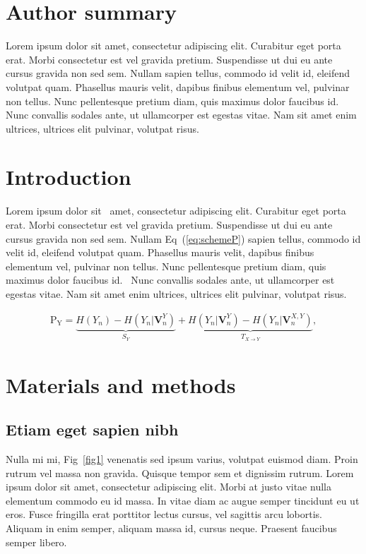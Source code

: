 \documentclass[10pt,letterpaper]{article}
\begin{document}
\section*{Author summary}
Lorem ipsum dolor sit amet, consectetur adipiscing elit. Curabitur eget porta erat. Morbi consectetur est vel gravida pretium. Suspendisse ut dui eu ante cursus gravida non sed sem. Nullam sapien tellus, commodo id velit id, eleifend volutpat quam. Phasellus mauris velit, dapibus finibus elementum vel, pulvinar non tellus. Nunc pellentesque pretium diam, quis maximus dolor faucibus id. Nunc convallis sodales ante, ut ullamcorper est egestas vitae. Nam sit amet enim ultrices, ultrices elit pulvinar, volutpat risus.

\linenumbers

\section*{Introduction}
Lorem ipsum dolor sit~\cite{bib1} amet, consectetur adipiscing elit. Curabitur eget porta erat. Morbi consectetur est vel gravida pretium. Suspendisse ut dui eu ante cursus gravida non sed sem. Nullam Eq~(\ref{eq:schemeP}) sapien tellus, commodo id velit id, eleifend volutpat quam. Phasellus mauris velit, dapibus finibus elementum vel, pulvinar non tellus. Nunc pellentesque pretium diam, quis maximus dolor faucibus id.~\cite{bib2} Nunc convallis sodales ante, ut ullamcorper est egestas vitae. Nam sit amet enim ultrices, ultrices elit pulvinar, volutpat risus.

\begin{eqnarray}
\label{eq:schemeP}
	\mathrm{P_Y} = \underbrace{H(Y_n) - H(Y_n|\mathbf{V}^{Y}_{n})}_{S_Y} + \underbrace{H(Y_n|\mathbf{V}^{Y}_{n})- H(Y_n|\mathbf{V}^{X,Y}_{n})}_{T_{X\rightarrow Y}},
\end{eqnarray}

\section*{Materials and methods}
\subsection*{Etiam eget sapien nibh}

Nulla mi mi, Fig~\ref{fig1} venenatis sed ipsum varius, volutpat euismod diam. Proin rutrum vel massa non gravida. Quisque tempor sem et dignissim rutrum. Lorem ipsum dolor sit amet, consectetur adipiscing elit. Morbi at justo vitae nulla elementum commodo eu id massa. In vitae diam ac augue semper tincidunt eu ut eros. Fusce fringilla erat porttitor lectus cursus,  vel sagittis arcu lobortis. Aliquam in enim semper, aliquam massa id, cursus neque. Praesent faucibus semper libero.
\end{document}
